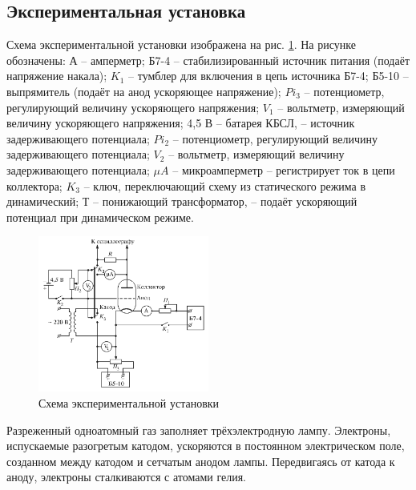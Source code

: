 \subsection*{Экспериментальная установка}

Схема экспериментальной установки изображена на рис. \ref{fig:exp}. На рисунке обозначены:
А -- амперметр;
Б7-4 -- стабилизированный источник питания (подаёт напряжение накала);
$K_1$ -- тумблер для включения в цепь источника Б7-4;
Б5-10 -- выпрямитель (подаёт на анод ускоряющее напряжение);
$Pi_3$ -- потенциометр, регулирующий величину ускоряющего напряжения;
$V_1$ -- вольтметр, измеряющий величину ускоряющего напряжения;
4,5 В -- батарея КБСЛ, -- источник задерживающего потенциала;
$Pi_2$ -- потенциометр, регулирующий величину задерживающего потенциала;
$V_2$ -- вольтметр, измеряющий величину задерживающего потенциала;
$\mu A$ -- микроамперметр -- регистрирует ток в цепи коллектора;
$K_3$ -- ключ, переключающий схему из статического режима в динамический;
Т -- понижающий трансформатор, -- подаёт ускоряющий потенциал при динамическом режиме.

\begin{figure}[ht]
    \centering
    \includegraphics[width=0.5\textwidth]{figures/exp.png}
    \caption{Схема экспериментальной установки}
    \label{fig:exp}
\end{figure}


Разреженный одноатомный газ заполняет трёхэлектродную лампу. Электроны, испускаемые разогретым катодом, ускоряются в постоянном электрическом поле, созданном между катодом и сетчатым анодом лампы. Передвигаясь от катода к аноду, электроны сталкиваются с атомами гелия.
